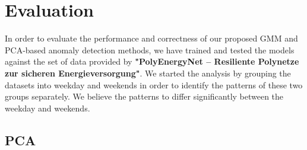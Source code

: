 \chapter{Evaluation}

In order to evaluate the performance and correctness of our proposed GMM and PCA-based anomaly detection methods, we have trained and tested the models against the set of data provided by \textbf{"PolyEnergyNet – Resiliente Polynetze zur sicheren Energieversorgung"}. We started the analysis by grouping the datasets into weekday and weekends in order to identify the patterns of these two groups separately. We believe the patterns to differ significantly between the weekday and weekends. \\

\section{PCA}

